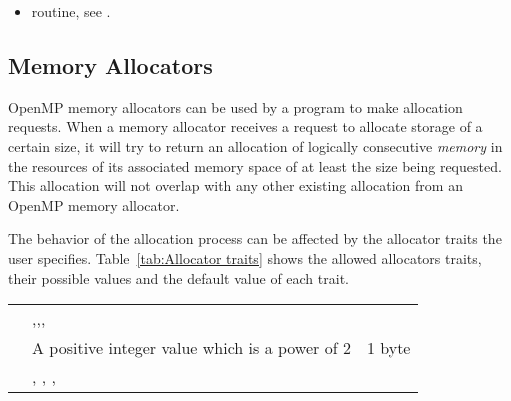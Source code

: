 \linenumbers

\crossreferences
\begin{itemize}
\item {} routine, see .
\end{itemize}

\subsection{Memory Allocators}
\label{subsec:Memory Allocators}

OpenMP memory allocators can be used by a program to make allocation requests. When a memory allocator receives a request to allocate storage of a certain size, it will try to return an allocation of logically consecutive \emph{memory} in the resources of its associated memory space of at least the size being requested. This allocation will not overlap with any other existing allocation from an OpenMP memory allocator. 

The behavior of the allocation process can be affected by the allocator traits the user specifies. Table~\ref{tab:Allocator traits} shows the allowed allocators traits, their possible values and the default value of each trait. %

\nolinenumbers
\renewcommand{\arraystretch}{1.5}
\tablelasttail{\hline}
\begin{supertabular}{p{1.2in}p{2.4in}p{1.2in}}
{} & {,,,} & {}\\
{} & A positive integer value which is a power of 2& 1 byte\\
{} & {, , , } & {}\\
\end{supertabular}
\linenumbers

